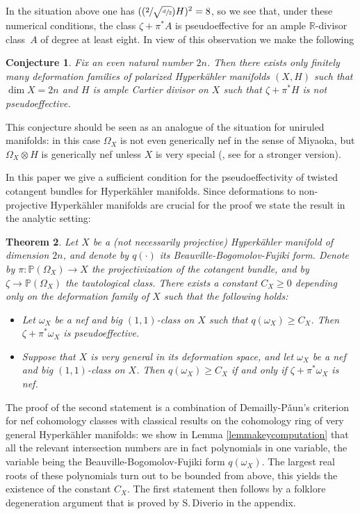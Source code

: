\documentclass[JEP,XML,SOM,Unicode,NoEqCountersInSection,published]{cedram}
\newcommand{\Psfrac}[2]{(\sfrac{#1}{#2})}
\theoremstyle{plain}
\newtheorem{theorem}{Theorem}[section]
\newtheorem{conjecture}[theorem]{Conjecture}
\theoremstyle{definition}
\newcommand{\R}{\ensuremath{\mathbb{R}}}
\newcommand{\PP}{\ensuremath{\mathbb{P}}}
\newcommand{\holom}[3]{\ensuremath{#1:#2\to #3}}
\begin{document}
In the situation above one has $(\Psfrac{2}{\sqrt{\sfrac{d}{2}}}H)^2 = 8$, so we see that, under these numerical conditions, the class $\zeta+\pi^* A$
is pseudoeffective for an ample $\R$-divisor class~$A$ of degree at least eight.
In view of this observation we make the following

\begin{conjecture} \label{conjecturegeneral}
Fix an even natural number $2n$. Then there exists only
finitely many deformation families of polarized Hyperkähler manifolds $(X, H)$ such that $\dim X=2n$ and
$H$ is ample Cartier divisor on $X$ such that $\zeta + \pi^* H$ is not pseudoeffective.
\end{conjecture}

This conjecture should be seen as an analogue of the situation for uniruled manifolds: in this case $\Omega_X$
is not even generically nef in the sense of Miyaoka, but $\Omega_X \otimes H$ is
generically nef unless $X$ is very special (\cite[Th.\,1.1]{Hoe14}, see \cite[Cor.\,1.3]{AD17} for a stronger version).

In this paper we give a sufficient condition for the pseudoeffectivity of twisted cotangent bundles
for Hyperkähler manifolds. Since deformations to non-projective Hyperkähler manifolds
are crucial for the proof we state the result in the analytic setting:

\begin{theorem}\label{theoremmain}
Let $X$ be a (not necessarily projective) Hyperkähler manifold of dimension $2n$,
and denote by $q(\cdot)$ its Beauville-Bogomolov-Fujiki form.
Denote by $\holom{\pi}{\PP(\Omega_X)}{X}$ the projectivization of the cotangent bundle, and by $\zeta \to \PP(\Omega_X)$ the tautological class.
There exists a constant $C_X \geq 0$ depending only on the deformation family of $X$ such that
the following holds:
\begin{itemize}
\item Let $\omega_X$ be a nef and big $(1,1)$-class on $X$ such that $q(\omega_X) \geq C_X$.
Then $\zeta+\pi^*\omega_X$ is pseudoeffective.
\item Suppose that $X$ is very general in its deformation space, and let
$\omega_X$ be a nef and big $(1,1)$-class on $X$.
Then $q(\omega_X) \geq C_X$ if and only if $\zeta+\pi^*\omega_X$ is nef.
\end{itemize}
\end{theorem}

The proof of the second statement is a combination of Demailly-P\v aun's criterion for nef cohomology classes with
classical results on the cohomology ring of very general Hyperkähler manifolds: we show in Lemma \ref{lemmakeycomputation} that all the relevant intersection numbers are in fact polynomials in one variable,
the variable being the Beauville-Bogomolov-Fujiki form $q(\omega_X)$. The largest real roots of these polynomials turn out to be bounded from above, this yields the existence of the constant $C_X$. The first statement then follows by a folklore
degeneration argument that is proved by S.\,Diverio in the appendix.
\end{document}
